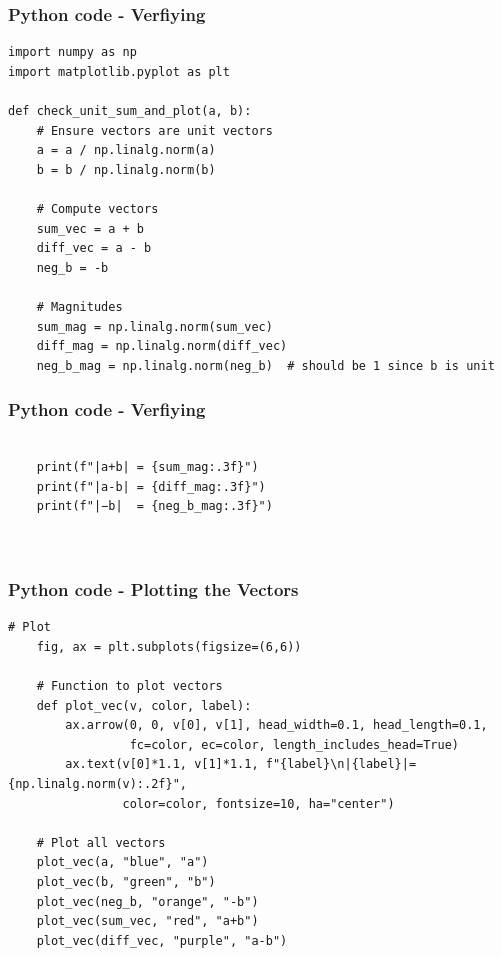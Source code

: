 \documentclass{beamer}
\begin{document}
\begin{frame}[fragile]                            
\frametitle{Python code - Verfiying }                
\begin{lstlisting}
import numpy as np
import matplotlib.pyplot as plt

def check_unit_sum_and_plot(a, b):
    # Ensure vectors are unit vectors
    a = a / np.linalg.norm(a)
    b = b / np.linalg.norm(b)
    
    # Compute vectors
    sum_vec = a + b
    diff_vec = a - b
    neg_b = -b
    
    # Magnitudes
    sum_mag = np.linalg.norm(sum_vec)
    diff_mag = np.linalg.norm(diff_vec)
    neg_b_mag = np.linalg.norm(neg_b)  # should be 1 since b is unit
\end{lstlisting}

    \end{frame}
\begin{frame}[fragile]                            
\frametitle{Python code - Verfiying}                
\begin{lstlisting}
 
    print(f"|a+b| = {sum_mag:.3f}")
    print(f"|a-b| = {diff_mag:.3f}")
    print(f"|−b|  = {neg_b_mag:.3f}")

   

\end{lstlisting}
\end{frame}

\begin{frame}[fragile]                            
\frametitle{Python code - Plotting the Vectors}                
\begin{lstlisting}
# Plot
    fig, ax = plt.subplots(figsize=(6,6))
    
    # Function to plot vectors
    def plot_vec(v, color, label):
        ax.arrow(0, 0, v[0], v[1], head_width=0.1, head_length=0.1,
                 fc=color, ec=color, length_includes_head=True)
        ax.text(v[0]*1.1, v[1]*1.1, f"{label}\n|{label}|={np.linalg.norm(v):.2f}", 
                color=color, fontsize=10, ha="center")
    
    # Plot all vectors
    plot_vec(a, "blue", "a")
    plot_vec(b, "green", "b")
    plot_vec(neg_b, "orange", "-b")
    plot_vec(sum_vec, "red", "a+b")
    plot_vec(diff_vec, "purple", "a-b")
   \end{lstlisting}
\end{frame}
\end{document}
